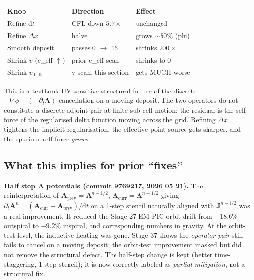 \documentclass[11pt,a4paper]{article}
\newcommand{\vv}[1]{\mathbf{#1}}
\newcommand{\dd}{\mathrm{d}}
\begin{document}
\begin{center}
\begin{tabular}{lll}
\toprule
Knob               & Direction                & Effect           \\
\midrule
Refine $\dd t$            & CFL down $5.7\times$         & unchanged        \\
Refine $\Delta x$         & halve                    & grows $\sim 50\%$ (phi) \\
Smooth deposit     & passes 0 $\to$ 16          & shrinks $200\times$    \\
Shrink $v$ (c\_eff $\uparrow$)  & prior c\_eff scan & shrinks to 0 \\
Shrink $v_{\mathrm{drift}}$  & v scan, this section & gets MUCH worse  \\
\bottomrule
\end{tabular}
\end{center}

This is a textbook UV-sensitive structural failure of the discrete
$-\nabla\phi + (-\partial_t\vv{A})$ cancellation on a moving deposit.
The two operators do not constitute a discrete adjoint pair at finite
sub-cell motion; the residual is the self-force of the regularised
delta function moving across the grid.  Refining $\Delta x$ tightens
the implicit regularisation, the effective point-source gets sharper,
and the spurious self-force \emph{grows}.

\subsection{What this implies for prior ``fixes''}

\textbf{Half-step $\vv{A}$ potentials (commit 9769217, 2026-05-21).}
The reinterpretation of $\vv{A}_{\mathrm{prev}} = \vv{A}^{n-1/2}$,
$\vv{A}_{\mathrm{curr}} = \vv{A}^{n+1/2}$ giving $\partial_t \vv{A}^n =
(\vv{A}_{\mathrm{curr}} - \vv{A}_{\mathrm{prev}})/\dd t$ on a 1-step
stencil naturally aligned with $\vv{J}^{n-1/2}$ was a real
improvement.  It reduced the Stage 27 EM PIC orbit drift from
$+18.6\%$ outspiral to $-9.2\%$ inspiral, and corresponding numbers in
gravity.  At the orbit-test level, the inductive heating was gone.
Stage 37 shows the \emph{operator pair} still fails to cancel on a
moving deposit; the orbit-test improvement masked but did not remove
the structural defect.  The half-step change is kept (better
time-staggering, 1-step stencil); it is now correctly labeled as
\emph{partial mitigation}, not a structural fix.
\end{document}
